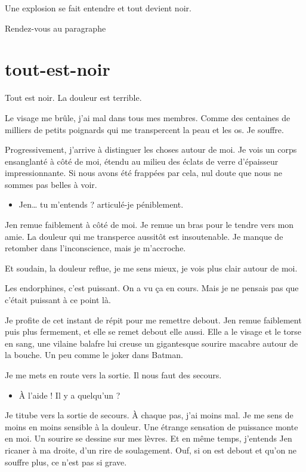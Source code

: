 Une explosion se fait entendre et tout devient noir.

\item Rendez-vous au paragraphe 
\enw

\section{tout-est-noir}

Tout est noir. La douleur est terrible.

Le visage me brûle, j'ai mal dans tous mes membres. Comme des centaines de milliers de petits poignards qui me transpercent la peau et les os. Je souffre.

Progressivement, j'arrive à distinguer les choses autour de moi. Je vois un corps ensanglanté à côté de moi, étendu au milieu des éclats de verre d'épaisseur impressionnante. Si nous avons été frappées par cela, nul doute que nous ne sommes pas belles à voir.

\begin{itemize}
\item Jen… tu m'entends ? articulé-je péniblement.
\end{itemize}

Jen remue faiblement à côté de moi. Je remue un bras pour le tendre vers mon amie. La douleur qui me transperce aussitôt est insoutenable. Je manque de retomber dans l'inconscience, mais je m'accroche.

Et soudain, la douleur reflue, je me sens mieux, je vois plus clair autour de moi.

Les endorphines, c'est puissant. On a vu ça en cours. Mais je ne pensais pas que c'était puissant à ce point là.

Je profite de cet instant de répit pour me remettre debout. Jen remue faiblement puis plus fermement, et elle se remet debout elle aussi. Elle a le visage et le torse en sang, une vilaine balafre lui creuse un gigantesque sourire macabre autour de la bouche. Un peu comme le joker dans Batman.

Je me mets en route vers la sortie. Il nous faut des secours.

\begin{itemize}
\item À l'aide ! Il y a quelqu'un ?
\end{itemize}

Je titube vers la sortie de secours. À chaque pas, j'ai moins mal. Je me sens de moins en moins sensible à la douleur. Une étrange sensation de puissance monte en moi. Un sourire se dessine sur mes lèvres. Et en même temps, j'entends Jen ricaner à ma droite, d'un rire de soulagement. Ouf, si on est debout et qu'on ne souffre plus, ce n'est pas si grave.


